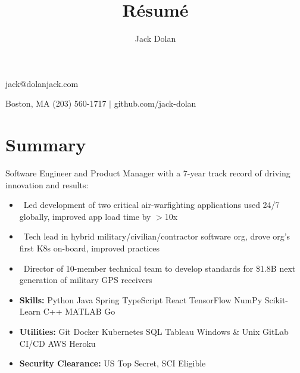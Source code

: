 \documentclass{article}
\makeatletter
\renewcommand{\maketitle}{ 
{\huge\bfseries\theauthor}\hfill jack@dolanjack.com 

\vspace{0.2em} 

Boston, MA \hfill (203) 560-1717 $|$ github.com/jack-dolan
}
\makeatother
\begin{document}
 
\title{R\'esum\'e} 
\author{Jack Dolan} 
\maketitle
{}


\section{Summary} 
Software Engineer and Product Manager with a 7-year track record of driving innovation and results:
    \begin{itemize}
    \itemsep0em
    \item \ Led development of two critical air-warfighting applications used 24/7 globally, improved app load time by $>$10x
    \item \ Tech lead in hybrid military/civilian/contractor software org, drove org’s first K8s on-board, improved practices
    \item \ Director of 10-member technical team to develop standards for \$1.8B next generation of military GPS receivers
    \newline
    \item \textbf{Skills:} Python \text{\textbar} Java \text{\textbar} Spring \text{\textbar} TypeScript \text{\textbar} React \text{\textbar} TensorFlow \text{\textbar} NumPy \text{\textbar} Scikit-Learn \text{\textbar} C++ \text{\textbar} MATLAB \text{\textbar} Go
    \item \textbf{Utilities:} Git \text{\textbar} Docker \text{\textbar} Kubernetes \text{\textbar} SQL \text{\textbar} Tableau \text{\textbar} Windows \& Unix \text{\textbar} GitLab CI/CD \text{\textbar} AWS \text{\textbar} Heroku
    \item \textbf{Security Clearance:} US Top Secret, SCI Eligible \end{itemize} 

\end{document}

